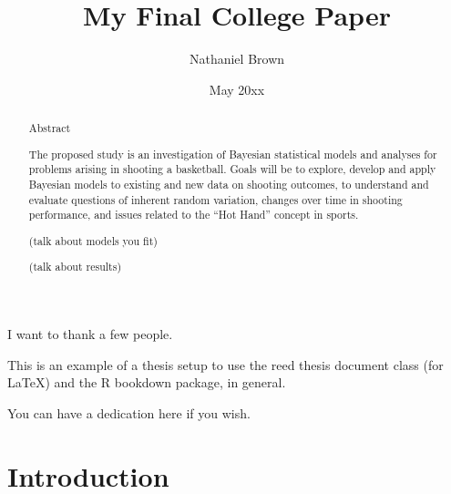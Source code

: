 \documentclass[12pt,twoside]{dukestatscithesis}
\title{My Final College Paper}
\author{Nathaniel Brown}
\date{May 20xx}
\theoremstyle{definition}
\theoremstyle{definition}
\theoremstyle{definition}
\theoremstyle{remark}
\begin{document}
  \maketitle

\frontmatter %
\pagestyle{empty} %
  \begin{acknowledgements}
    I want to thank a few people.
  \end{acknowledgements}
  \begin{preface}
    This is an example of a thesis setup to use the reed thesis document
    class (for LaTeX) and the R bookdown package, in general.
  \end{preface}
  \hypersetup{linkcolor=black}
  \setcounter{tocdepth}{2}
  \tableofcontents

  \listoftables

  \listoffigures
  \begin{abstract}
    \chapter{Abstract}\label{abstract}
    
    The proposed study is an investigation of Bayesian statistical models
    and analyses for problems arising in shooting a basketball. Goals will
    be to explore, develop and apply Bayesian models to existing and new
    data on shooting outcomes, to understand and evaluate questions of
    inherent random variation, changes over time in shooting performance,
    and issues related to the ``Hot Hand'' concept in sports.
    
    \par
    
    (talk about models you fit)
    
    \par
    
    (talk about results)
  \end{abstract}
  \begin{dedication}
    You can have a dedication here if you wish.
  \end{dedication}
\mainmatter %
\pagestyle{fancyplain} %

\chapter*{Introduction}\label{introduction}
\end{document}
